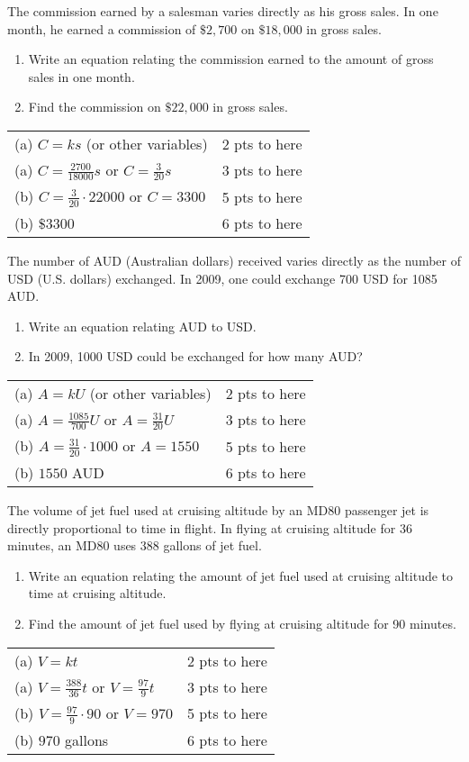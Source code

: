{
	The commission earned by a salesman varies directly as his gross sales. In one month, he earned a commission of $\$2,\!700$ on $\$18,\!000$ in gross sales. 
	\begin{enumerate}
	\item Write an equation relating the commission earned to the amount of gross sales in one month.
	\item Find the commission on $\$22,\!000$ in gross sales.
	\end{enumerate}
}
{
	\begin{tabular}{l r}
	(a) $C = ks$ (or other variables) & 2 pts to here\\
	(a) $C=\frac{2700}{18000}s$ or $C = \frac{3}{20}s$ & 3 pts to here\\
	(b) $C = \frac{3}{20}\cdot 22000$ or $C=3300$ & 5 pts to here\\
	(b) $\$3300$ & 6 pts to here
	\end{tabular}
}

{
	The number of AUD (Australian dollars) received varies directly as the number of USD (U.S. dollars) exchanged. In 2009, one could exchange 700 USD for 1085 AUD. 
	\begin{enumerate}
	\item Write an equation relating AUD to USD.
	\item In 2009, 1000 USD could be exchanged for how many AUD?
	\end{enumerate}
}
{
	\begin{tabular}{l r}
	(a) $A = kU$ (or other variables) & 2 pts to here\\
	(a) $A = \frac{1085}{700}U$ or $A = \frac{31}{20}U$ & 3 pts to here\\
	(b) $A = \frac{31}{20}\cdot 1000$ or $A=1550$ & 5 pts to here\\
	(b) $1550$ AUD & 6 pts to here
	\end{tabular}
}

{
	The volume of jet fuel used at cruising altitude by an MD80 passenger jet is directly proportional to time in flight. In flying at cruising altitude for 36 minutes, an MD80 uses 388 gallons of jet fuel.
	\begin{enumerate}
	\item Write an equation relating the amount of jet fuel used at cruising altitude to time at cruising altitude.
	\item Find the amount of jet fuel used by flying at cruising altitude for 90 minutes.
	\end{enumerate}
}
{
	\begin{tabular}{l r}
	(a) $V = kt$ & 2 pts to here\\
	(a) $V = \frac{388}{36}t$ or $V = \frac{97}{9}t$ & 3 pts to here\\
	(b) $V = \frac{97}{9}\cdot 90$ or $V=970$ & 5 pts to here\\
	(b) $970$ gallons & 6 pts to here
	\end{tabular}
}


